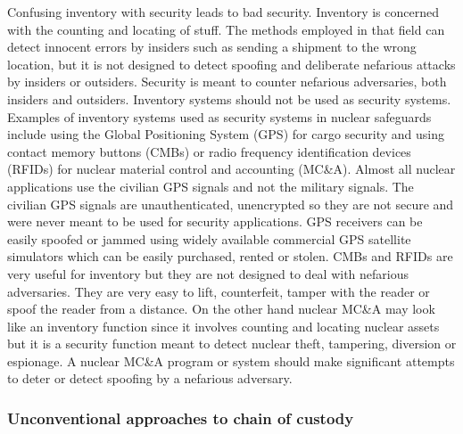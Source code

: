 \documentclass[twoside,titlepage,11pt,twocolumn,a4paper]{article}
\begin{document}
Confusing inventory with security leads to bad security. Inventory is
concerned with the counting and locating of stuff. The methods
employed in that field can detect innocent errors by insiders such as
sending a shipment to the wrong location, but it is not designed to
detect spoofing and deliberate nefarious attacks by insiders or
outsiders. \citep{handbookSecBlunders2010} Security is meant to
counter nefarious adversaries, both insiders and
outsiders. \citep{insiderThreat2011} Inventory systems should not be
used as security systems. Examples of inventory systems used as
security systems in nuclear safeguards include using the Global
Positioning System (GPS) for cargo security and using contact memory
buttons (CMBs) or radio frequency identification devices (RFIDs) for
nuclear material control and accounting
(MC\&A). \citep{handbookSecBlunders2010} Almost all nuclear
applications use the civilian GPS signals and not the military
signals.  The civilian GPS signals are unauthenticated, unencrypted so
they are not secure and were never meant to be used for security
applications. GPS receivers can be easily spoofed or jammed using
widely available commercial GPS satellite simulators which can be
easily purchased, rented or stolen. CMBs and RFIDs are very useful for
inventory but they are not designed to deal with nefarious
adversaries. They are very easy to lift, counterfeit, tamper with the
reader or spoof the reader from a
distance. \citep{nuclearSafeguardsAndSec2005} On the other hand
nuclear MC\&A may look like an inventory function since it involves
counting and locating nuclear assets but it is a security function
meant to detect nuclear theft, tampering, diversion or espionage.  A
nuclear MC\&A program or system should make significant attempts to
deter or detect spoofing by a nefarious
adversary. \citep{handbookSecBlunders2010}

\subsubsection{Unconventional approaches to chain of custody}
\end{document}
